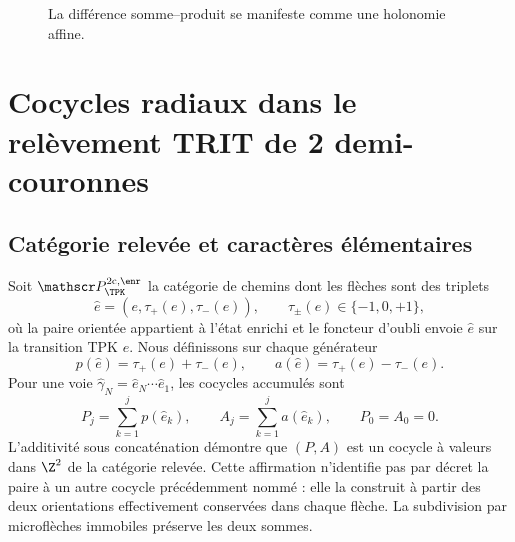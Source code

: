 \begin{figure}[!htb]
\centering
{}
\caption{La différence somme--produit se manifeste comme une holonomie affine.}
\label{espiral:fig:cuadrado-afin}
\end{figure}

\chapter{Cocycles radiaux dans le relèvement TRIT de 2 demi-couronnes}
\label{espiral:chap:cociclos-radiales}

\section{Catégorie relevée et caractères élémentaires}

Soit \(\mathscr P_{\TPK}^{2\mathrm c,\enr}\) la catégorie de chemins dont les flèches sont des triplets
\[
 \widehat e=(e,\tau_+(e),\tau_-(e)),
 \qquad \tau_\pm(e)\in\{-1,0,+1\},
\]
où la paire orientée appartient à l'état enrichi et le foncteur d'oubli envoie \(\widehat e\) sur la transition TPK \(e\). Nous définissons sur chaque générateur
\begin{equation}
 p(\widehat e)=\tau_+(e)+\tau_-(e),
 \qquad
 a(\widehat e)=\tau_+(e)-\tau_-(e).
 \label{espiral:eq:carta-doble-trit}
\end{equation}
Pour une voie \(\widehat\gamma_N=\widehat e_N\cdots\widehat e_1\), les cocycles accumulés sont
\begin{equation}
 P_j=\sum_{k=1}^{j}p(\widehat e_k),
 \qquad
 A_j=\sum_{k=1}^{j}a(\widehat e_k),
 \qquad P_0=A_0=0.
 \label{espiral:eq:cociclos-radiales}
\end{equation}
L'additivité sous concaténation démontre que \((P,A)\) est un cocycle à valeurs dans \(\Z^2\) de la catégorie relevée. Cette affirmation n'identifie pas par décret la paire à un autre cocycle précédemment nommé : elle la construit à partir des deux orientations effectivement conservées dans chaque flèche. La subdivision par microflèches immobiles préserve les deux sommes.

